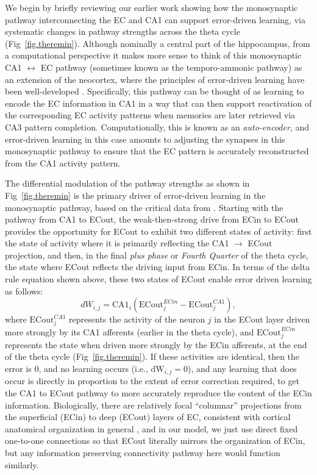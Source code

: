\documentclass[11pt,twoside]{article}
\newif\myifpdf
\begin{document}
We begin by briefly reviewing our earlier work showing how the monosynaptic pathway interconnecting the EC and CA1 can support error-driven learning, via systematic changes in pathway strengths across the theta cycle \citep{KetzMorkondaOReilly13,HasselmoBodelonWyble02,SiegleWilson14} (Fig~\ref{fig.theremin}).  Although nominally a central part of the hippocampus, from a computational perspective it makes more sense to think of this monosynaptic CA1 $\leftrightarrow$ EC pathway (sometimes known as the temporo-ammonic pathway) as an extension of the neocortex, where the principles of error-driven learning have been well-developed \citep{OReilly96,WhittingtonBogacz19,LillicrapSantoroMarrisEtAl20}.  Specifically, this pathway can be thought of as learning to encode the EC information in CA1 in a way that can then support reactivation of the corresponding EC activity patterns when memories are later retrieved via CA3 pattern completion.  Computationally, this is known as an \emph{auto-encoder}, and error-driven learning in this case amounts to adjusting the synapses in this monosynaptic pathway to ensure that the EC pattern is accurately reconstructed from the CA1 activity pattern.

The differential modulation of the pathway strengths as shown in Fig~\ref{fig.theremin} is the primary driver of error-driven learning in the monosynaptic pathway, based on the critical data from \citet{HasselmoBodelonWyble02}.  Starting with the pathway from CA1 to ECout, the weak-then-strong drive from ECin to ECout provides the opportunity for ECout to exhibit two different states of activity: first the state of activity where it is primarily reflecting the CA1 $\rightarrow$ ECout projection, and then, in the final \emph{plus phase} or \emph{Fourth Quarter} of the theta cycle, the state where ECout reflects the driving input from ECin.  In terms of the delta rule equation shown above, these two states of ECout enable error driven learning as follows:
\begin{equation}
\label{eq.ECoutEDL}
    dW_{i,j} = \mbox{CA1}_i ( \mbox{ECout}_j^{ECin} - \mbox{ECout}_j^{CA1} ) ,
\end{equation}
where $\mbox{ECout}_j^{CA1}$ represents the activity of the neuron $j$ in the ECout layer driven more strongly by its CA1 afferents (earlier in the theta cycle), and $\mbox{ECout}_j^{ECin}$ represents the state when driven more strongly by the ECin afferents, at the end of the theta cycle (Fig~\ref{fig.theremin}).  If these activities are identical, then the error is 0, and no learning occurs (i.e., $\mbox{dW}_{i,j} = 0$), and any learning that does occur is directly in proportion to the extent of error correction required, to get the CA1 to ECout pathway to more accurately reproduce the content of the ECin information.  Biologically, there are relatively focal ``columnar'' projections from the superficial (ECin) to deep (ECout) layers of EC, consistent with cortical anatomical organization in general \citep{SurmeliMarcuMcClureEtAl15,WitterDoanJacobsenEtAl17,GerleiBrownSurmeliEtAl21}, and in our model, we just use direct fixed one-to-one connections so that ECout literally mirrors the organization of ECin, but any information preserving connectivity pathway here would function similarly.
\end{document}
